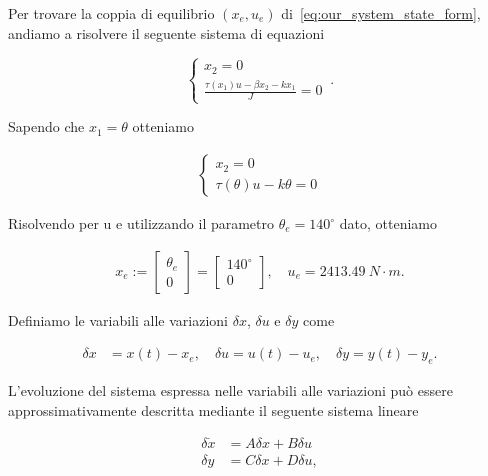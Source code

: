 \documentclass[a4paper, 11pt]{article}
\begin{document}
Per trovare la coppia di equilibrio $(x_e, u_e)$ di~\ref{eq:our_system_state_form}, andiamo a risolvere il seguente sistema di equazioni

\begin{equation}
    \begin{cases}
        x_2  = 0
        \\
        \frac{\tau(x_1)u - \beta x_2 - kx_1}{J} = 0
    \end{cases}\,.
\end{equation}

Sapendo che $x_1 = \theta$ otteniamo

\begin{align*}
    \begin{cases}
        x_2 = 0
        \\
        \tau(\theta)u - k\theta = 0
    \end{cases}
\end{align*}

Risolvendo per u e utilizzando il parametro $\theta_e = 140^\circ$ dato, otteniamo 

\begin{align}
    x_e := \begin{bmatrix}
        \theta_e
        \\ 0
    \end{bmatrix} = \begin{bmatrix}
        140^\circ
        \\ 0
    \end{bmatrix},
    \quad u_e = 2413.49 \ N \cdot m.\label{eq:equilibirum_pair}
\end{align}

Definiamo le variabili alle variazioni $\delta x$, $\delta u$ e $\delta y$ come

\begin{align*}
    \delta x &= x(t) - x_e, 
    \quad
    \delta u = u(t) - u_e, 
    \quad
    \delta y = y(t) - y_e.
\end{align*}

L'evoluzione del sistema espressa nelle variabili alle variazioni pu\`o essere approssimativamente descritta mediante il seguente sistema lineare

\begin{subequations}\label{eq:linearized_system}
\begin{align}
    \delta \dot{x} &= A\delta x + B\delta u
    \\
    \delta y &= C\delta x + D\delta u,
\end{align}
\end{subequations}
\end{document}
